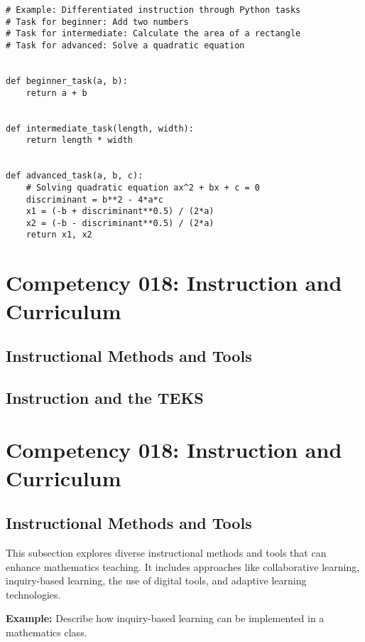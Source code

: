 \documentclass{book}
\begin{document}
\begin{lstlisting}[style=pythonstyle]
# Example: Differentiated instruction through Python tasks
# Task for beginner: Add two numbers
# Task for intermediate: Calculate the area of a rectangle
# Task for advanced: Solve a quadratic equation


def beginner_task(a, b):
    return a + b


def intermediate_task(length, width):
    return length * width


def advanced_task(a, b, c):
    # Solving quadratic equation ax^2 + bx + c = 0
    discriminant = b**2 - 4*a*c
    x1 = (-b + discriminant**0.5) / (2*a)
    x2 = (-b - discriminant**0.5) / (2*a)
    return x1, x2
\end{lstlisting}





\section{Competency 018: Instruction and Curriculum}
\subsection{Instructional Methods and Tools}
\subsection{Instruction and the TEKS}


\section{Competency 018: Instruction and Curriculum}


\subsection{Instructional Methods and Tools}
This subsection explores diverse instructional methods and tools that can enhance mathematics teaching. It includes approaches like collaborative learning, inquiry-based learning, the use of digital tools, and adaptive learning technologies.


\textbf{Example:} Describe how inquiry-based learning can be implemented in a mathematics class.
\end{document}
